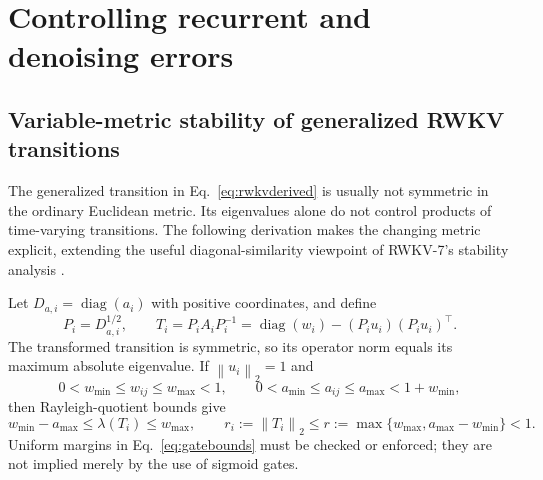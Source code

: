 \documentclass{article}
\theoremstyle{remark}\newtheorem{remark}[theorem]{Remark}
\newcommand{\diag}{\operatorname{diag}}
\newcommand{\norm}[1]{\left\lVert #1\right\rVert}
\begin{document}
\section{Controlling recurrent and denoising errors}
\subsection{Variable-metric stability of generalized RWKV transitions}
\label{sec:metric}
The generalized transition in Eq.~\eqref{eq:rwkvderived} is usually not symmetric in the ordinary Euclidean metric. Its eigenvalues alone do not control products of time-varying transitions. The following derivation makes the changing metric explicit, extending the useful diagonal-similarity viewpoint of RWKV-7's stability analysis \cite{rwkv7}.

Let $D_{a,i}=\diag(a_i)$ with positive coordinates, and define
\begin{equation}
 P_i=D_{a,i}^{1/2},\qquad
 T_i=P_i A_iP_i^{-1}
 =\diag(w_i)-(P_i u_i)(P_i u_i)^\top.
 \label{eq:sym}
\end{equation}
The transformed transition is symmetric, so its operator norm equals its maximum absolute eigenvalue. If $\norm{u_i}_2=1$ and
\begin{equation}
 0<w_{\min}\le w_{ij}\le w_{\max}<1,
 \qquad 0<a_{\min}\le a_{ij}\le a_{\max}<1+w_{\min},
 \label{eq:gatebounds}
\end{equation}
then Rayleigh-quotient bounds give
\begin{equation}
 w_{\min}-a_{\max}\le\lambda(T_i)\le w_{\max},\qquad
 r_i:=\norm{T_i}_2\le r:=\max\{w_{\max},a_{\max}-w_{\min}\}<1.
 \label{eq:r}
\end{equation}
Uniform margins in Eq.~\eqref{eq:gatebounds} must be checked or enforced; they are not implied merely by the use of sigmoid gates.
\end{document}
